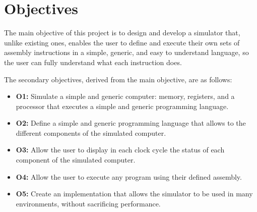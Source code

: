 \section{Objectives}\label{sec:objectives}
The main objective of this project is to design and develop a simulator that, unlike existing ones, enables the user to define and execute their own sets of \gls{assembly} instructions in a simple, generic, and easy to understand language, so the user can fully understand what each instruction does.

\noindent
The secondary objectives, derived from the main objective, are as follows:
\begin{itemize}
  \item \textbf{O1:} Simulate a simple and generic \gls{computer}: \gls{memory}, \glspl{register}, and a \gls{processor} that executes a simple and generic \gls{programming language}.
  \item \textbf{O2:} Define a simple and generic \gls{programming language} that allows to  the different components of the simulated \gls{computer}.
  \item \textbf{O3:} Allow the user to display in each \gls{clock cycle} the status of each component of the simulated
  \gls{computer}.
  \item \textbf{O4:} Allow the user to execute any program using their defined \gls{assembly}.
  \item \textbf{O5:} Create an implementation that allows the simulator to be used in many environments, without sacrificing performance.
\end{itemize}


